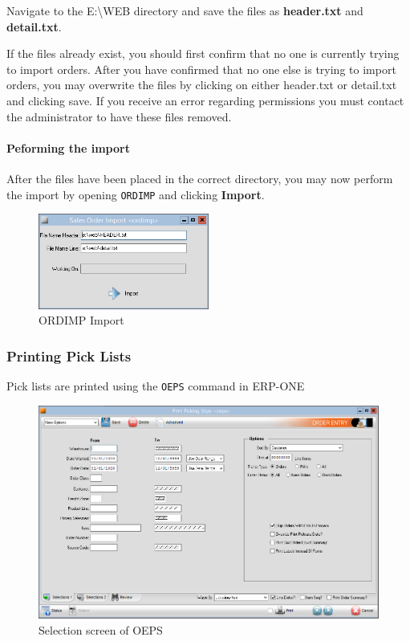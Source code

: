 Navigate to the E:{\textbackslash}WEB directory and save the files as \textbf{header.txt} and \textbf{detail.txt}.

If the files already exist, you should first confirm that no one is currently trying to import orders. After you have confirmed that no one else is trying to import orders, you may overwrite the files by clicking on either header.txt or detail.txt and clicking save. If you receive an error regarding permissions you must contact the administrator to have these files removed.

\paragraph{Peforming the import}

After the files have been placed in the correct directory, you may now perform the import by opening \texttt{ORDIMP} and clicking \textbf{Import\textsl{}}.

\begin{figure}[H]
	\centering
	\includegraphics[width=0.5\textwidth]{../img/image46}
	\caption{ORDIMP Import}
\end{figure}\textsl{}

\subsubsection{Printing Pick Lists}


Pick lists are printed using the \texttt{OEPS} command in ERP-ONE

\begin{figure}[H]
	\includegraphics[width=\textwidth]{../img/image1}
	\caption{Selection screen of OEPS}
\end{figure}


